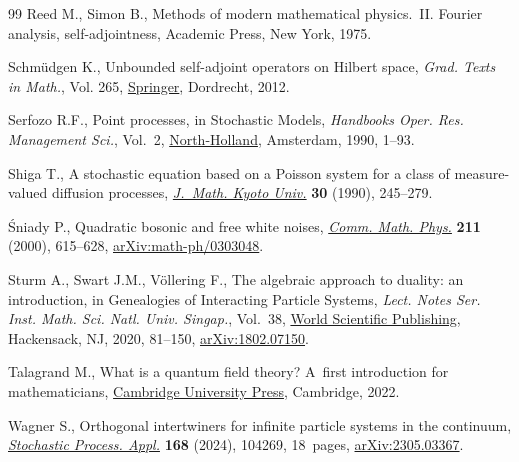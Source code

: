 \documentclass[10pt,a4paper]{amsart}
\numberwithin{equation}{section}
\newcommand{\1}{\mathbbm{1}}
\begin{document}
\begin{thebibliography}{99}
Reed M., Simon B., Methods of modern mathematical physics.~{II}. {F}ourier
 analysis, self-adjointness, Academic Press, New York, 1975.

Schm\"udgen K., Unbounded self-adjoint operators on Hilbert space,
 \textit{Grad. Texts in Math.}, Vol. 265, \href{https://doi.org/10.1007/978-94-007-4753-1}{Springer}, Dordrecht, 2012.

Serfozo R.F., Point processes, in Stochastic Models, \textit{Handbooks Oper.
 Res. Management Sci.}, Vol.~2, \href{https://doi.org/10.1016/S0927-0507(05)80165-3}{North-Holland}, Amsterdam, 1990, 1--93.

Shiga T., A stochastic equation based on a {P}oisson system for a class of
 measure-valued diffusion processes, \href{https://doi.org/10.1215/kjm/1250520071}{\textit{J.~Math. Kyoto Univ.}} \textbf{30}
 (1990), 245--279.

\'Sniady P., Quadratic bosonic and free white noises, \href{https://doi.org/10.1007/s002200050828}{\textit{Comm. Math.
 Phys.}} \textbf{211} (2000), 615--628, \href{https://arxiv.org/abs/math-ph/0303048}{arXiv:math-ph/0303048}.

Sturm A., Swart J.M., V\"ollering F., The algebraic approach to duality: an
 introduction, in Genealogies of Interacting Particle Systems, \textit{Lect.
 Notes Ser. Inst. Math. Sci. Natl. Univ. Singap.}, Vol.~38, \href{https://doi.org/10.1142/9789811206092_0003}{World Scientific
 Publishing}, Hackensack, NJ, 2020, 81--150, \href{https://arxiv.org/abs/1802.07150}{arXiv:1802.07150}.

Talagrand M., What is a quantum field theory? {A}~first introduction for
 mathematicians, \href{https://doi.org/10.1017/9781108225144}{Cambridge University Press}, Cambridge, 2022.

Wagner S., Orthogonal intertwiners for infinite particle systems in the
 continuum, \href{https://doi.org/10.1016/j.spa.2023.104269}{\textit{Stochastic Process. Appl.}} \textbf{168} (2024), 104269,
 18~pages, \href{https://arxiv.org/abs/2305.03367}{arXiv:2305.03367}.

\end{thebibliography}
\end{document}
